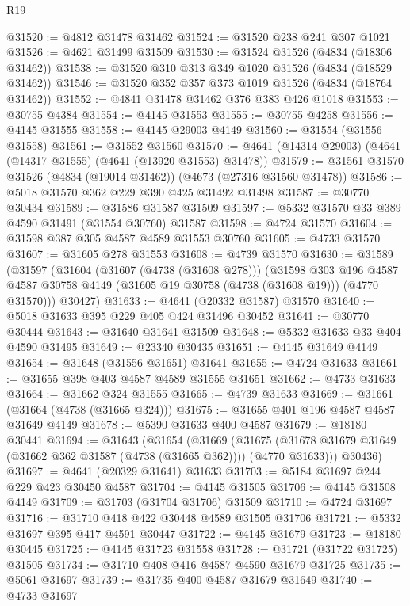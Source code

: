 \begin{lexlean}{R19}
\begin{coremodule}
@31520 := @4812 @31478 @31462
@31524 := @31520 @238 @241 @307 @1021
@31526 := @4621 @31499 @31509
@31530 := @31524 @31526 (@4834 (@18306 @31462))
@31538 := @31520 @310 @313 @349 @1020 @31526 (@4834 (@18529 @31462))
@31546 := @31520 @352 @357 @373 @1019 @31526 (@4834 (@18764 @31462))
@31552 := @4841 @31478 @31462 @376 @383 @426 @1018
@31553 := @30755 @4384
@31554 := @4145 @31553
@31555 := @30755 @4258
@31556 := @4145 @31555
@31558 := @4145 @29003 @4149
@31560 := @31554 (@31556 @31558)
@31561 := @31552 @31560
@31570 := @4641 (@14314 @29003) (@4641 (@14317 @31555) (@4641 (@13920 @31553) @31478))
@31579 := @31561 @31570 @31526 (@4834 (@19014 @31462)) (@4673 (@27316 @31560 @31478))
@31586 := @5018 @31570 @362 @229 @390 @425 @31492 @31498
@31587 := @30770 @30434
@31589 := @31586 @31587 @31509
@31597 := @5332 @31570 @33 @389 @4590 @31491 (@31554 @30760) @31587
@31598 := @4724 @31570
@31604 := @31598 @387 @305 @4587 @4589 @31553 @30760
@31605 := @4733 @31570
@31607 := @31605 @278 @31553
@31608 := @4739 @31570
@31630 := @31589
    (@31597
      (@31604
        (@31607 (@4738 (@31608 @278)))
        (@31598
          @303
          @196
          @4587
          @4587
          @30758
          @4149
          (@31605 @19 @30758 (@4738 (@31608 @19)))
          (@4770 @31570)))
      @30427)
@31633 := @4641 (@20332 @31587) @31570
@31640 := @5018 @31633 @395 @229 @405 @424 @31496 @30452
@31641 := @30770 @30444
@31643 := @31640 @31641 @31509
@31648 := @5332 @31633 @33 @404 @4590 @31495
@31649 := @23340 @30435
@31651 := @4145 @31649 @4149
@31654 := @31648 (@31556 @31651) @31641
@31655 := @4724 @31633
@31661 := @31655 @398 @403 @4587 @4589 @31555 @31651
@31662 := @4733 @31633
@31664 := @31662 @324 @31555
@31665 := @4739 @31633
@31669 := @31661 (@31664 (@4738 (@31665 @324)))
@31675 := @31655 @401 @196 @4587 @4587 @31649 @4149
@31678 := @5390 @31633 @400 @4587
@31679 := @18180 @30441
@31694 := @31643
    (@31654
      (@31669
        (@31675 (@31678 @31679 @31649 (@31662 @362 @31587 (@4738 (@31665 @362)))) (@4770 @31633)))
      @30436)
@31697 := @4641 (@20329 @31641) @31633
@31703 := @5184 @31697 @244 @229 @423 @30450 @4587
@31704 := @4145 @31505
@31706 := @4145 @31508 @4149
@31709 := @31703 (@31704 @31706) @31509
@31710 := @4724 @31697
@31716 := @31710 @418 @422 @30448 @4589 @31505 @31706
@31721 := @5332 @31697 @395 @417 @4591 @30447
@31722 := @4145 @31679
@31723 := @18180 @30445
@31725 := @4145 @31723 @31558
@31728 := @31721 (@31722 @31725) @31505
@31734 := @31710 @408 @416 @4587 @4590 @31679 @31725
@31735 := @5061 @31697
@31739 := @31735 @400 @4587 @31679 @31649
@31740 := @4733 @31697

\end{coremodule}
\end{lexlean}
